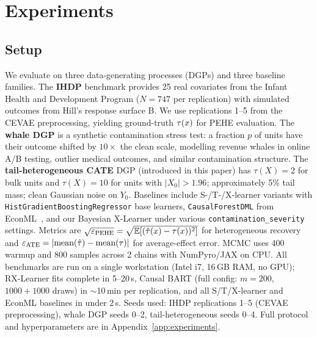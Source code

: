 \section{Experiments}
\label{sec:experiments}

\subsection{Setup}
\label{sec:experiments:setup}
We evaluate on three data-generating processes (DGPs) and three
baseline families. The \textbf{IHDP} benchmark
\citep{hill2011bayesian} provides 25 real covariates from the
Infant Health and Development Program ($N = 747$ per replication)
with simulated outcomes from Hill's response surface B. We use
replications 1--5 from the CEVAE preprocessing, yielding ground-truth
$\tau(x)$ for PEHE evaluation. The \textbf{whale DGP} is a synthetic
contamination stress test: a fraction $p$ of units have their
outcome shifted by $10 \times$ the clean scale, modelling revenue
whales in online A/B testing, outlier medical outcomes, and similar
contamination structure. The \textbf{tail-heterogeneous CATE} DGP (introduced in
this paper) has $\tau(X) = 2$ for bulk units and $\tau(X) = 10$ for
units with $|X_0| > 1.96$; approximately 5\% tail mass; clean
Gaussian noise on $Y_0$. Baselines include S-/T-/X-learner variants
with \texttt{HistGradientBoostingRegressor} base learners,
\texttt{CausalForestDML} from EconML~\citep{battocchi2019econml},
and our Bayesian X-Learner under various
\texttt{contamination\_severity} settings. Metrics are
$\sqrt{\varepsilon_{\mathrm{PEHE}}} = \sqrt{\mathbb{E}[(\hat\tau(x) - \tau(x))^2]}$ for
heterogeneous recovery and $\varepsilon_{\mathrm{ATE}} = |\text{mean}(\hat\tau) -
\text{mean}(\tau)|$ for average-effect error. MCMC uses 400 warmup
and 800 samples across 2 chains with NumPyro/JAX on CPU. All
benchmarks are run on a single workstation (Intel i7, 16\,GB RAM,
no GPU); RX-Learner fits complete in 5--20\,s, Causal BART (full config:
$m = 200$, $1000+1000$ draws) in $\sim$10\,min per replication, and
all S/T/X-learner and EconML baselines in under 2\,s. Seeds used: IHDP replications 1--5 (CEVAE preprocessing),
whale DGP seeds 0--2, tail-heterogeneous seeds 0--4. Full protocol
and hyperparameters are in Appendix~\ref{app:experiments}.

